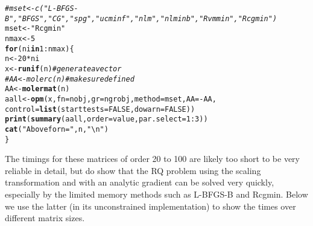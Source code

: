 \documentclass[10pt]{article}\usepackage[]{graphicx}\usepackage[]{color}
\makeatletter
\newcommand{\hlnum}[1]{\textcolor[rgb]{0.686,0.059,0.569}{#1}}%
\newcommand{\hlstr}[1]{\textcolor[rgb]{0.192,0.494,0.8}{#1}}%
\newcommand{\hlcom}[1]{\textcolor[rgb]{0.678,0.584,0.686}{\textit{#1}}}%
\newcommand{\hlopt}[1]{\textcolor[rgb]{0,0,0}{#1}}%
\newcommand{\hlstd}[1]{\textcolor[rgb]{0.345,0.345,0.345}{#1}}%
\newcommand{\hlkwa}[1]{\textcolor[rgb]{0.161,0.373,0.58}{\textbf{#1}}}%
\newcommand{\hlkwb}[1]{\textcolor[rgb]{0.69,0.353,0.396}{#1}}%
\newcommand{\hlkwc}[1]{\textcolor[rgb]{0.333,0.667,0.333}{#1}}%
\newcommand{\hlkwd}[1]{\textcolor[rgb]{0.737,0.353,0.396}{\textbf{#1}}}%
\newenvironment{kframe}{%
 \def\at@end@of@kframe{}%
 \ifinner\ifhmode%
  \def\at@end@of@kframe{\end{minipage}}%
  \begin{minipage}{\columnwidth}%
 \fi\fi%
 \def\FrameCommand##1{\hskip\@totalleftmargin \hskip-\fboxsep
 \colorbox{shadecolor}{##1}\hskip-\fboxsep
     \hskip-\linewidth \hskip-\@totalleftmargin \hskip\columnwidth}%
 \MakeFramed {\advance\hsize-\width
   \@totalleftmargin\z@ \linewidth\hsize
   \@setminipage}}%
 {\par\unskip\endMakeFramed%
 \at@end@of@kframe}
\newenvironment{knitrout}{}{} %
\makeatother
\begin{document}
\begin{knitrout}
\begin{kframe}
{\ttfamily\noindent\color{warningcolor}{\#\# Warning in library(package, lib.loc = lib.loc, character.only = TRUE, logical.return = TRUE, : there is no package called 'optimrx'}}\begin{alltt}
\hlcom{# mset<-c("L-BFGS-B", "BFGS", "CG", "spg", "ucminf", "nlm", "nlminb", "Rvmmin", "Rcgmin")}
\hlstd{mset}\hlkwb{<-}\hlstr{"Rcgmin"}
\hlstd{nmax}\hlkwb{<-}\hlnum{5}
\hlkwa{for} \hlstd{(ni} \hlkwa{in} \hlnum{1}\hlopt{:}\hlstd{nmax)\{}
  \hlstd{n}\hlkwb{<-}\hlnum{20}\hlopt{*}\hlstd{ni}
  \hlstd{x}\hlkwb{<-}\hlkwd{runif}\hlstd{(n)} \hlcom{# generate a vector }
\hlcom{#  AA<-molerc(n) # make sure defined}
  \hlstd{AA}\hlkwb{<-}\hlkwd{molermat}\hlstd{(n)}
  \hlstd{aall}\hlkwb{<-}\hlkwd{opm}\hlstd{(x,} \hlkwc{fn}\hlstd{=nobj,} \hlkwc{gr}\hlstd{=ngrobj,} \hlkwc{method}\hlstd{=mset,} \hlkwc{AA}\hlstd{=}\hlopt{-}\hlstd{AA,}
     \hlkwc{control}\hlstd{=}\hlkwd{list}\hlstd{(}\hlkwc{starttests}\hlstd{=}\hlnum{FALSE}\hlstd{,}  \hlkwc{dowarn}\hlstd{=}\hlnum{FALSE}\hlstd{))}
  \hlkwd{print}\hlstd{(}\hlkwd{summary}\hlstd{(aall,} \hlkwc{order}\hlstd{=value,} \hlkwc{par.select}\hlstd{=}\hlnum{1}\hlopt{:}\hlnum{3}\hlstd{))}
  \hlkwd{cat}\hlstd{(}\hlstr{"Above for n="}\hlstd{,n,}\hlstr{" \textbackslash{}n"}\hlstd{)}
\hlstd{\}}
\end{alltt}


{\ttfamily\noindent\bfseries{}}\end{kframe}
\end{knitrout}

The timings for these matrices of order 20 to 100 are likely too short to be very
reliable in detail, but do show that the RQ problem using the scaling transformation
and with an analytic gradient can be solved very quickly, especially by the limited
memory methods such as L-BFGS-B and Rcgmin. Below we use the latter (in its 
unconstrained implementation) to show the times over different matrix sizes.
\end{document}
